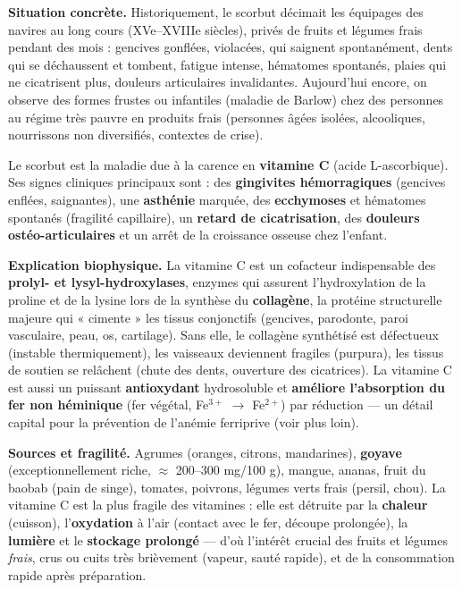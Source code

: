 \documentclass[11pt]{article}
\newcommand{\cle}[1]{{\popxbold\color{popdark}#1}}
\newcounter{popsec}
\newcounter{popsub}
\newcommand{\courssub}[1]{%
  \stepcounter{popsub}%
  \par\vspace{9pt}\noindent{\popxbold\fontsize{11.5}{13}\selectfont\color{popink}{\color{poporange}\thepopsec.\thepopsub}\hspace{6pt}#1}\par\nopagebreak\vspace{4pt}
}
\begin{document}
\courssub{La carence en vitamine C : le scorbut}

\textbf{Situation concrète.} Historiquement, le scorbut décimait les équipages des navires au long cours (XVe–XVIIIe siècles), privés de fruits et légumes frais pendant des mois : gencives gonflées, violacées, qui saignent spontanément, dents qui se déchaussent et tombent, fatigue intense, hématomes spontanés, plaies qui ne cicatrisent plus, douleurs articulaires invalidantes. Aujourd'hui encore, on observe des formes frustes ou infantiles (maladie de Barlow) chez des personnes au régime très pauvre en produits frais (personnes âgées isolées, alcooliques, nourrissons non diversifiés, contextes de crise).

\begin{definition}[Scorbut]
Le \cle{scorbut} est la maladie due à la carence en \textbf{vitamine C} (acide L-ascorbique). Ses signes cliniques principaux sont : des \textbf{gingivites hémorragiques} (gencives enflées, saignantes), une \textbf{asthénie} marquée, des \textbf{ecchymoses} et hématomes spontanés (fragilité capillaire), un \textbf{retard de cicatrisation}, des \textbf{douleurs ostéo-articulaires} et un arrêt de la croissance osseuse chez l'enfant.
\end{definition}

\textbf{Explication biophysique.} La vitamine C est un cofacteur indispensable des \textbf{prolyl- et lysyl-hydroxylases}, enzymes qui assurent l'hydroxylation de la proline et de la lysine lors de la synthèse du \textbf{collagène}, la protéine structurelle majeure qui « cimente » les tissus conjonctifs (gencives, parodonte, paroi vasculaire, peau, os, cartilage). Sans elle, le collagène synthétisé est défectueux (instable thermiquement), les vaisseaux deviennent fragiles (purpura), les tissus de soutien se relâchent (chute des dents, ouverture des cicatrices). La vitamine C est aussi un puissant \textbf{antioxydant} hydrosoluble et \textbf{améliore l'absorption du fer non héminique} (fer végétal, Fe$^{3+}$ $\to$ Fe$^{2+}$) par réduction — un détail capital pour la prévention de l'anémie ferriprive (voir plus loin).

\textbf{Sources et fragilité.} Agrumes (oranges, citrons, mandarines), \textbf{goyave} (exceptionnellement riche, $\approx$ 200--300 mg/100 g), mangue, ananas, fruit du baobab (pain de singe), tomates, poivrons, légumes verts frais (persil, chou). La vitamine C est la plus fragile des vitamines : elle est détruite par la \textbf{chaleur} (cuisson), l'\textbf{oxydation} à l'air (contact avec le fer, découpe prolongée), la \textbf{lumière} et le \textbf{stockage prolongé} — d'où l'intérêt crucial des fruits et légumes \emph{frais}, crus ou cuits très brièvement (vapeur, sauté rapide), et de la consommation rapide après préparation.
\end{document}
